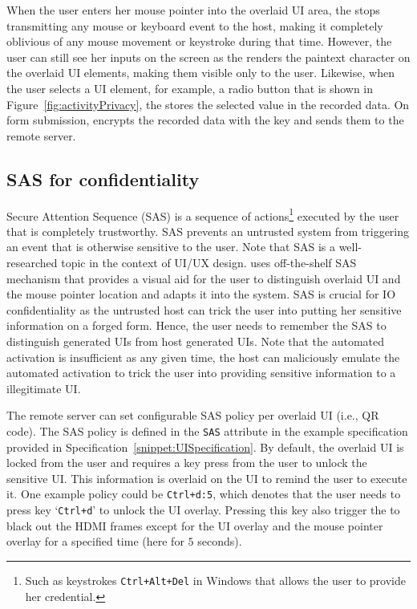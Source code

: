  When the user enters her mouse pointer into the overlaid UI area, the \device stops transmitting any mouse or keyboard event to the host, making it completely oblivious of any mouse movement or keystroke during that time. 
However, the user can still see her inputs on the screen as the \device renders the paintext character on the overlaid UI elements, making them visible only to the user.
Likewise, when the user selects a UI element, for example, a radio button that is shown in Figure~\ref{fig:activityPrivacy}, the \device stores the selected value in the recorded data.
On form submission, \device encrypts the recorded data with the \tls key and sends them to the remote server.

\subsection{SAS for confidentiality} 
\label{sec:confidentiality:SAS}

Secure Attention Sequence (SAS) is a sequence of actions\footnote{Such as keystrokes \texttt{Ctrl+Alt+Del} in Windows that allows the user to provide her credential.} executed by the user that is completely trustworthy. SAS prevents an untrusted system from triggering an event that is otherwise sensitive to the user. Note that SAS is a well-researched topic in the context of UI/UX design. \name uses off-the-shelf SAS mechanism that provides a visual aid for the user to distinguish overlaid UI and the mouse pointer location and adapts it into the system. SAS is crucial for IO confidentiality as the untrusted host can trick the user into putting her sensitive information on a forged form. Hence, the user needs to remember the SAS to distinguish \device generated UIs from host generated UIs. Note that the automated activation is insufficient as any given time, the host can maliciously emulate the automated activation to trick the user into providing sensitive information to a illegitimate UI. 

 The remote server can set configurable SAS policy per overlaid UI (i.e., QR code). The SAS policy is defined in the \texttt{SAS} attribute in the example specification provided in Specification~\ref{snippet:UISpecification}. By default, the overlaid UI is locked from the user and requires a key press from the user to unlock the sensitive UI. This information is overlaid on the UI to remind the user to execute it. One example policy could be \texttt{Ctrl+d:5}, which denotes that the user needs to press key `\texttt{Ctrl+d}' to unlock the UI overlay. Pressing this key also trigger the \device to black out the HDMI frames except for the UI overlay and the mouse pointer overlay for a specified time (here for $5$ seconds). 


